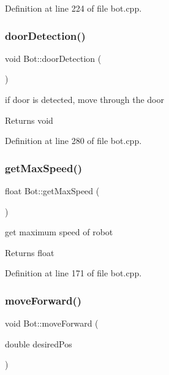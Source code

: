 Definition at line 224 of file bot.\+cpp.

\mbox{\label{class_bot_a308e7e40f00a853d1397cfafcb7d2cd5}} 
\subsubsection{\texorpdfstring{door\+Detection()}{doorDetection()}}
{\footnotesize\ttfamily void Bot\+::door\+Detection (\begin{DoxyParamCaption}{ }\end{DoxyParamCaption})}



if door is detected, move through the door 

\begin{DoxyReturn}{Returns}
void 
\end{DoxyReturn}


Definition at line 280 of file bot.\+cpp.

\mbox{\label{class_bot_a4a3b192232d8b938f11c1d253795c222}} 
\subsubsection{\texorpdfstring{get\+Max\+Speed()}{getMaxSpeed()}}
{\footnotesize\ttfamily float Bot\+::get\+Max\+Speed (\begin{DoxyParamCaption}{ }\end{DoxyParamCaption})}



get maximum speed of robot 

\begin{DoxyReturn}{Returns}
float 
\end{DoxyReturn}


Definition at line 171 of file bot.\+cpp.

\mbox{\label{class_bot_abc25556b72a44e45056d161eaa48e1c6}} 
\subsubsection{\texorpdfstring{move\+Forward()}{moveForward()}}
{\footnotesize\ttfamily void Bot\+::move\+Forward (\begin{DoxyParamCaption}\item[{double}]{desired\+Pos }\end{DoxyParamCaption})}



